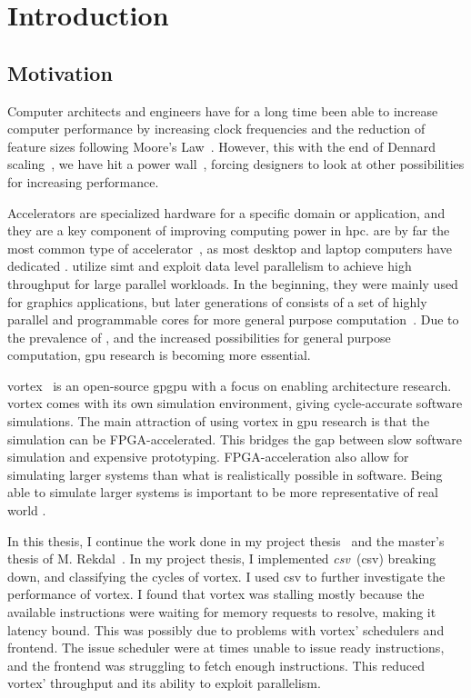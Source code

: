 \chapter{Introduction}

\section{Motivation}

Computer architects and engineers have for a long time been able to increase computer performance by increasing clock frequencies and the reduction of feature sizes following Moore's Law~\cite{moore}. However, this with the end of Dennard scaling~\cite{dennard_scaling}, we have hit a power wall~\cite{powerwall}, forcing designers to look at other possibilities for increasing performance. 

Accelerators are specialized hardware for a specific domain or application, and they are a key component of improving computing power in \acrfull{hpc}.  are by far the most common type of accelerator~\cite{gpu_trends}, as most desktop and laptop computers have dedicated .  utilize \acrshort{simt} and exploit data level parallelism to achieve high throughput for large parallel workloads. In the beginning, they were mainly used for graphics applications, but later generations of  consists of a set of highly parallel and programmable cores for more general purpose computation~\cite{gpu_history}. Due to the prevalence of , and the increased possibilities for general purpose computation, \acrshort{gpu} research is becoming more essential.

\Gls{vortex}~\cite{vortex} is an open-source \acrshort{gpgpu} with a focus on enabling architecture research. \Gls{vortex} comes with its own simulation environment, giving cycle-accurate software simulations. The main attraction of using \Gls{vortex} in \acrshort{gpu} research is that the simulation can be FPGA-accelerated. This bridges the gap between slow software simulation and expensive prototyping. FPGA-acceleration also allow for simulating larger systems than what is realistically possible in software. Being able to simulate larger systems is important to be more representative of real world .

In this thesis, I continue the work done in my project thesis~\cite{Aurud_Project} and the master's thesis of M. Rekdal~\cite{Rekdal_Master}. In my project thesis, I implemented \textit{\acrlong{csv}}~(\acrshort{csv}) breaking down, and classifying the cycles of \Gls{vortex}. I used \acrshort{csv} to further investigate the performance of \Gls{vortex}. I found that \Gls{vortex} was stalling mostly because the available instructions were waiting for memory requests to resolve, making it latency bound. This was possibly due to problems with \Gls{vortex}' schedulers and frontend. The issue scheduler were at times unable to issue ready instructions, and the frontend was struggling to fetch enough instructions. This reduced \Gls{vortex}' throughput and its ability to exploit parallelism. 

